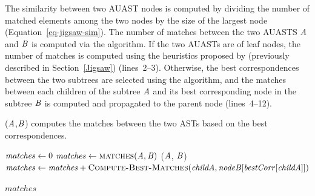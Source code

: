 


The similarity between two AUAST nodes is computed by dividing the number of matched elements among the two nodes by the size of the largest node (Equation~\ref{eq-jigsaw-sim}). The number of matches between the two AUASTS $\mathit{A}$ and $\mathit{B}$ is computed via the  algorithm. If the two AUASTs are of leaf nodes, the number of matches is computed using the heuristics proposed by \citet{2008:fse:cottrell} (previously described in Section~\ref{Jigsaw}) (lines~2--3). Otherwise, the best correspondences between the two subtrees are selected using the  algorithm, and the matches between each children of the subtree $\mathit{A}$ and its best corresponding node in the subtree $\mathit{B}$ is computed and propagated to the parent node (lines~4--12).


\begin{algorithm}
 \caption{($\mathit{A}$,$\mathit{B}$) computes the matches between the two ASTs based on the best correspondences.}
  \label{simi}
  \begin{algorithmic}[1]
  \ComputeBestMatches
  \State $\mathit{matches} \gets 0$
  \State $\mathit{matches} \gets   \textsc{matches}(\mathit{A},\mathit{B})$
    	\State {}($\mathit{A}$, $\mathit{B}$)
 		\State $\mathit{matches} \gets \mathit{matches}+\textsc{Compute-Best-Matches}(\mathit{childA},\mathit{nodeB}[\mathit{bestCorr}[\mathit{childA}]])$		 
 \EndIf
 \EndFor

 \EndIf
 \Return $matches$
\end{algorithmic}
\end{algorithm}






